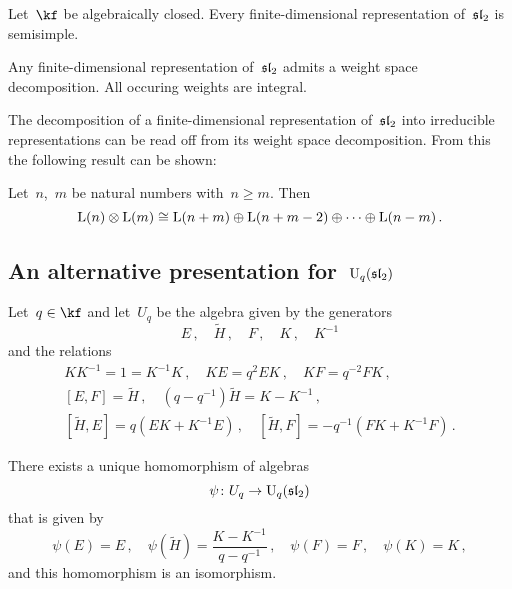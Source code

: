\documentclass[a4paper, 11pt, oneside]{scrartcl}
\begin{document}
\begin{theorem}[Weyl]
  Let~$\kf$ be algebraically closed.
  Every finite-dimensional representation of~$\mathfrak{sl}_2$ is semisimple.
\end{theorem}

\begin{corollary}
  Any finite-dimensional representation of~$\mathfrak{sl}_2$ admits a weight space decomposition.
  All occuring weights are integral.
\end{corollary}

The decomposition of a finite-dimensional representation of~$\mathfrak{sl}_2$ into irreducible representations can be read off from its weight space decomposition.
From this the following result can be shown:

\begin{proposition}
  Let~$n$,~$m$ be natural numbers with~$n \geq m$.
  Then
  \[
    \operatorname{L}(n) \otimes \operatorname{L}(m)
    \cong
    \operatorname{L}(n + m) \oplus \operatorname{L}(n + m - 2) \oplus \dotsb \oplus \operatorname{L}(n - m) \,.
  \]
\end{proposition}





\subsection{An alternative presentation for~$\operatorname{U}_q(\mathfrak{sl}_2)$}
\label{alternative presentation for quantum sl2}

Let~$q \in \kf$ and let~$U_q$ be the algebra given by the generators
\[
  E \,,
  \quad
  \widetilde{H} \,,
  \quad
  F \,,
  \quad
  K \,,
  \quad
  K^{-1} 
\]
and the relations
\begin{gather*}
  K K^{-1} = 1 = K^{-1} K \,,
  \quad
  KE = q^2 EK \,,
  \quad
  KF = q^{-2} FK \,,
  \\
  [E,F] = \widetilde{H} \,,
  \quad
  (q - q^{-1}) \widetilde{H} = K - K^{-1} \,,
  \\
  [\widetilde{H}, E] = q(EK + K^{-1} E) \,,
  \quad
  [\widetilde{H}, F] = -q^{-1}(FK + K^{-1} F) \,.
\end{gather*}

\begin{proposition}
  There exists a unique homomorphism of algebras
  \[
    \psi
    \colon
    U_q
    \to
    \operatorname{U}_q(\mathfrak{sl}_2)
  \]
  that is given by
  \[
    \psi(E) = E \,,
    \quad
    \psi(\widetilde{H}) = \frac{K - K^{-1}}{q - q^{-1}} \,,
    \quad
    \psi(F) = F \,,
    \quad
    \psi(K) = K \,,
  \]
  and this homomorphism is an isomorphism.
\end{proposition}
\end{document}
